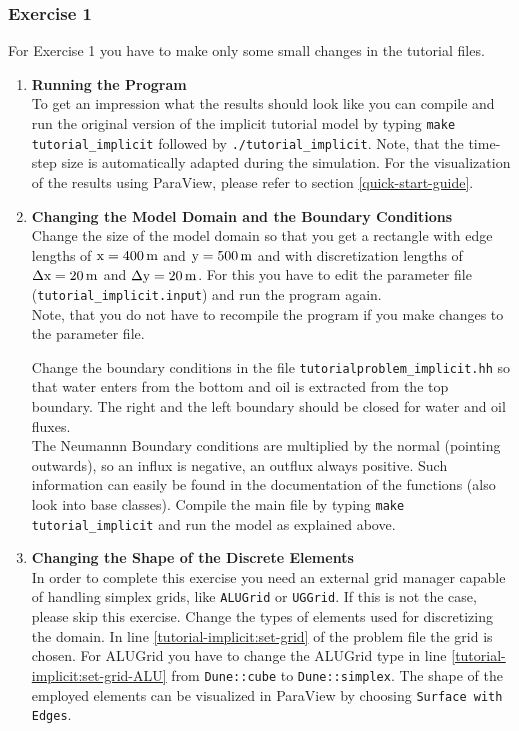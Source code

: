 \subsubsection{Exercise 1}
\renewcommand{\labelenumi}{\alph{enumi})} For Exercise 1 you have
to make only some small changes in the tutorial files.

\begin{enumerate}

\item \textbf{Running the Program} \\
To get an impression what the results should look like you can compile and run the original version of
the implicit tutorial model by typing \texttt{make tutorial\_implicit} followed by \texttt{./tutorial\_implicit}.
Note, that the time-step size is automatically adapted during the simulation.
For the visualization of the results using ParaView, please refer to section \ref{quick-start-guide}.

\item \textbf{Changing the Model Domain and the Boundary Conditions} \\
  Change the size of the model domain so that you get a rectangle with
  edge lengths of $\text{x} = \unit[400]{m}$ and $\text{y} = \unit[500]{m}$ and with
  discretization lengths of $\Delta \text{x} = \unit[20]{m}$ and $\Delta
  \text{y} = \unit[20]{m}$. For this you have to edit the parameter file (\texttt{tutorial\_implicit.input})
  and run the program again.\\
  Note, that you do not have to recompile the program if you make changes to the parameter file.


  Change the boundary conditions in the file
  \texttt{tutorialproblem\_implicit.hh} so that water enters from the
  bottom and oil is extracted from the top boundary. The right and the
  left boundary should be closed for water and oil fluxes. \\
  The Neumannn Boundary conditions are multiplied by the normal (pointing outwards),
  so an influx is negative, an outflux always positive.
  Such information can easily be found in the documentation of the functions (also look into base classes).
  Compile the main file by typing \texttt{make tutorial\_implicit} and
  run the model as explained above.

  \item \textbf{Changing  the Shape of the Discrete Elements} \\
  In order to complete this exercise you need an external grid manager capable of handling
  simplex grids, like \texttt{ALUGrid} or \texttt{UGGrid}. If this is not the case,
  please skip this exercise.
  Change the types of elements used for discretizing the domain. In line
  \ref{tutorial-implicit:set-grid} of the problem file the grid is chosen.
  For ALUGrid you have to change the ALUGrid type in line \ref{tutorial-implicit:set-grid-ALU} from \texttt{Dune::cube}
  to \texttt{Dune::simplex}.
  The shape of the employed elements can be visualized in ParaView by choosing \texttt{Surface with Edges}.


\end{enumerate}
